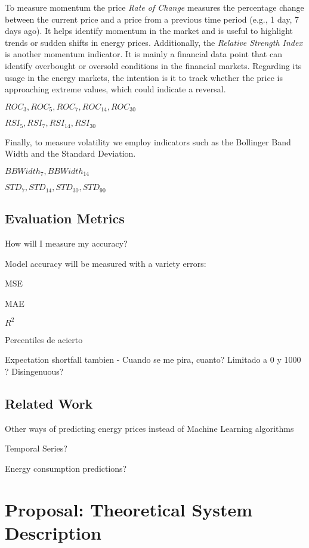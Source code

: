 \documentclass[12pt]{report} %
\begin{document}
To measure momentum the price \textit{Rate of Change} measures the percentage change between the current price and a price from a previous time period (e.g., 1 day, 7 days ago). It helps identify momentum in the market and is useful to highlight trends or sudden shifts in energy prices. Additionally, the \textit{Relative Strength Index} is another momentum indicator. It is mainly a financial data point that can identify overbought or oversold conditions in the financial markets. Regarding its usage in the energy markets, the intention is it to track whether the price is approaching extreme values, which could indicate a reversal.

    $ ROC_{3}, ROC_{5}, ROC_{7}, ROC_{14}, ROC_{30} $
    
    $ RSI_{5}, RSI_{7}, RSI_{14}, RSI_{30} $

Finally, to measure volatility we employ indicators such as the Bollinger Band Width and the Standard Deviation.
    
    $ BBWidth_{7}, BBWidth_{14} $
    
    $ STD_{7}, STD_{14}, STD_{30}, STD_{90} $


\section{Evaluation Metrics}
How will I measure my accuracy?

Model accuracy will be measured with a variety errors:

MSE

MAE

$ R^2 $

Percentiles de acierto

Expectation shortfall tambien - Cuando se me pira, cuanto? Limitado a 0 y 1000 ? Disingenuous?


\section{Related Work}
Other ways of predicting energy prices instead of Machine Learning algorithms

Temporal Series?

Energy consumption predictions?





\chapter{Proposal: Theoretical System Description}
\end{document}
